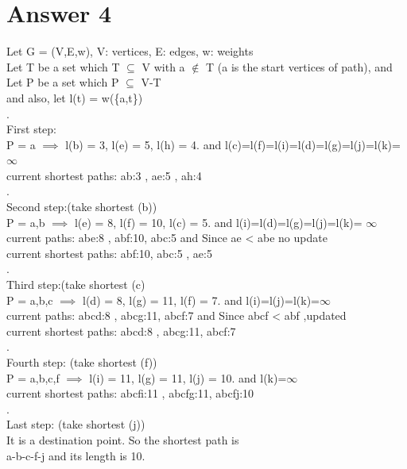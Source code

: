\documentclass[12pt]{article}
\begin{document}
\section*{Answer 4}
Let G = (V,E,w), V: vertices, E: edges, w: weights\\
Let T be a set which T $\subseteq$ V with a $\notin$ T (a is the start vertices of path), and Let P be a set which P $\subseteq$ V-T \\
and also, let l(t) = w(\{a,t\})\\.\\
First step:\\
P = {a} $\implies$ l(b) = 3, l(e) = 5, l(h) = 4. and l(c)=l(f)=l(i)=l(d)=l(g)=l(j)=l(k)= $\infty$\\
current shortest paths: ab:3 , ae:5 , ah:4\\.\\
Second step:(take shortest (b))\\
P = {a,b} $\implies$ l(e) = 8, l(f) = 10, l(c) = 5. and l(i)=l(d)=l(g)=l(j)=l(k)= $\infty$\\
current paths: abe:8 , abf:10, abc:5 and Since ae < abe no update\\
current shortest paths: abf:10, abc:5 , ae:5\\.\\
Third step:(take shortest (c)\\
P = {a,b,c} $\implies$ l(d) = 8, l(g) = 11, l(f) = 7. and l(i)=l(j)=l(k)=$\infty$\\
current paths: abcd:8 , abcg:11, abcf:7 and Since abcf < abf ,updated\\
current shortest paths: abcd:8 , abcg:11, abcf:7\\.\\
Fourth step: (take shortest (f))\\
P = {a,b,c,f} $\implies$ l(i) = 11, l(g) = 11, l(j) = 10. and l(k)=$\infty$\\
current shortest paths: abcfi:11 , abcfg:11, abcfj:10\\.\\
Last step: (take shortest (j))\\
It is a destination point. So the shortest path is\\
a-b-c-f-j and its length is 10.
\end{document}
